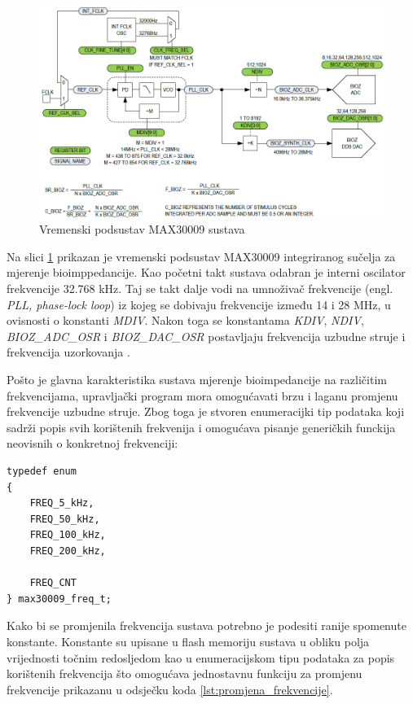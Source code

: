 \documentclass[../diplomski_rad.tex]{subfiles}
\begin{document}
\begin{figure}[htb]
    \centering
    \includegraphics[width=1\textwidth]{Figures/max30009_clock.png} 
    \caption{Vremenski podsustav MAX30009 sustava \cite{max30009_datasheet}}
    \label{slk:max_30009_clock}
\end{figure}

Na slici \ref{slk:max_30009_clock} prikazan je vremenski podsustav MAX30009 integriranog sučelja za mjerenje bioimppedancije.
Kao početni takt sustava odabran je interni oscilator frekvencije 32.768 kHz. Taj se takt dalje vodi na umnoživač frekvencije 
(engl. \textit{PLL, phase-lock loop}) iz kojeg se dobivaju frekvencije između 14 i 28 MHz, u ovisnosti o konstanti \textit{MDIV}. 
Nakon toga se konstantama \textit{KDIV}, \textit{NDIV}, 
\textit{BIOZ\_ADC\_OSR} i \textit{BIOZ\_DAC\_OSR} postavljaju frekvencija uzbudne struje i frekvencija uzorkovanja \cite{max30009_datasheet}.   

Pošto je glavna karakteristika sustava mjerenje bioimpedancije na različitim frekvencijama, upravljački program mora 
omogućavati brzu i laganu promjenu frekvencije uzbudne struje. Zbog toga je stvoren enumeracijki tip podataka koji 
sadrži popis svih korištenih frekvenija i omogućava pisanje generičkih funckija neovisnih o konkretnoj frekvenciji: 
\begin{lstlisting}[label={lst:enumeracija_frekvencija},style=CStyle,caption={Enumeracijski tip podataka za odabir frekvencije rada},captionpos=b]
typedef enum
{
    FREQ_5_kHz,
    FREQ_50_kHz,
    FREQ_100_kHz,
    FREQ_200_kHz,
    
    FREQ_CNT
} max30009_freq_t;
\end{lstlisting} 

Kako bi se promjenila frekvencija sustava potrebno je podesiti ranije spomenute konstante. 
Konstante su upisane u flash memoriju sustava u obliku polja vrijednosti točnim redosljedom kao 
u enumeracijskom tipu podataka za popis korištenih frekvencija što omogućava jednostavnu funkciju 
za promjenu frekvencije prikazanu u odsječku koda \ref{lst:promjena_frekvencije}. 
\end{document}
